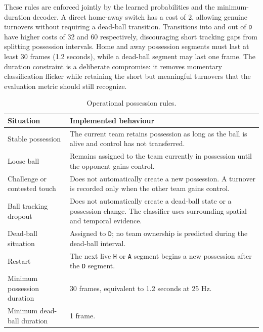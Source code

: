 \documentclass[11pt,a4paper]{article}
\begin{document}
These rules are enforced jointly by the learned probabilities and the minimum-duration decoder. A direct home-away switch has a cost of 2, allowing genuine turnovers without requiring a dead-ball transition. Transitions into and out of \texttt{D} have higher costs of 32 and 60 respectively, discouraging short tracking gaps from splitting possession intervals. Home and away possession segments must last at least 30 frames (1.2 seconds), while a dead-ball segment may last one frame. The duration constraint is a deliberate compromise: it removes momentary classification flicker while retaining the short but meaningful turnovers that the evaluation metric should still recognize.

\begin{table}[H]
\centering
\small
\caption{Operational possession rules.}

\begin{tabularx}{\textwidth}{L{0.27\textwidth} Y}
\toprule
\textbf{Situation} & \textbf{Implemented behaviour} \\
\midrule
Stable possession
&
The current team retains possession as long as the ball is alive and control has not transferred.
\\

Loose ball
&
Remains assigned to the team currently in possession until the opponent gains control.
\\

Challenge or contested touch
&
Does not automatically create a new possession. A turnover is recorded only when the other team gains control.
\\

Ball tracking dropout
&
Does not automatically create a dead-ball state or a possession change. The classifier uses surrounding spatial and temporal evidence.
\\

Dead-ball situation
&
Assigned to \texttt{D}; no team ownership is predicted during the dead-ball interval.
\\

Restart
&
The next live \texttt{H} or \texttt{A} segment begins a new possession after the \texttt{D} segment.
\\

Minimum possession duration
&
30 frames, equivalent to 1.2 seconds at 25 Hz.
\\

Minimum dead-ball duration
&
1 frame.
\\

\bottomrule
\end{tabularx}
\end{table}
\end{document}
